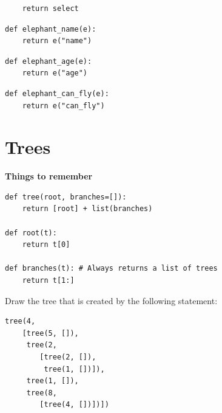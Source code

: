 \documentclass{exam}
\begin{document}
\begin{questions}
\begin{blocksection}
\begin{lstlisting}
    return select
\end{lstlisting}

\begin{lstlisting}
def elephant_name(e):
    return e("name")
\end{lstlisting}

\begin{lstlisting}
def elephant_age(e):
    return e("age")
\end{lstlisting}

\begin{lstlisting}
def elephant_can_fly(e):
    return e("can_fly")
\end{lstlisting}

\end{blocksection}

\newpage
\section{Trees}
\textbf{Things to remember}
\begin{lstlisting}
def tree(root, branches=[]):
    return [root] + list(branches)

def root(t):
    return t[0]

def branches(t): # Always returns a list of trees
    return t[1:]
\end{lstlisting}


\begin{blocksection}
\question Draw the tree that is created by the following statement:

\begin{lstlisting}
tree(4,
    [tree(5, []),
     tree(2,
        [tree(2, []),
         tree(1, [])]),
     tree(1, []),
     tree(8,
        [tree(4, [])])])
\end{lstlisting}
\begin{solution}[4in]
\end{solution}


\end{blocksection}
\end{questions}
\end{document}
